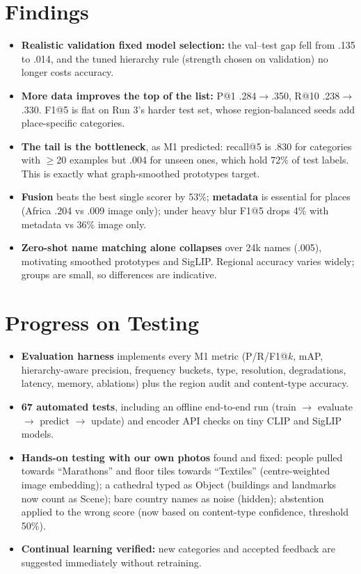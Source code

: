 \documentclass[10pt,twocolumn]{article}
\begin{document}
\section{Findings}
\begin{itemize}
\item \textbf{Realistic validation fixed model selection:} the val--test gap fell from .135 to .014, and the
tuned hierarchy rule (strength chosen on validation) no longer costs accuracy.
\item \textbf{More data improves the top of the list:} P@1 .284$\rightarrow$.350, R@10 .238$\rightarrow$.330.
F1@5 is flat on Run 3's harder test set, whose region-balanced seeds add place-specific categories.
\item \textbf{The tail is the bottleneck}, as M1 predicted: recall@5 is .830 for categories with $\geq$20
examples but .004 for unseen ones, which hold 72\% of test labels. This is exactly what graph-smoothed
prototypes target.
\item \textbf{Fusion} beats the best single scorer by 53\%; \textbf{metadata} is essential for places
(Africa .204 vs .009 image only); under heavy blur F1@5 drops 4\% with metadata vs 36\% image only.
\item \textbf{Zero-shot name matching alone collapses} over 24k names (.005), motivating smoothed prototypes and
SigLIP. Regional accuracy varies widely; groups are small, so differences are indicative.
\end{itemize}

\section{Progress on Testing}
\begin{itemize}
\item \textbf{Evaluation harness} implements every M1 metric (P/R/F1@$k$, mAP, hierarchy-aware precision,
frequency buckets, type, resolution, degradations, latency, memory, ablations) plus the region audit and
content-type accuracy.
\item \textbf{67 automated tests}, including an offline end-to-end run (train $\rightarrow$ evaluate
$\rightarrow$ predict $\rightarrow$ update) and encoder API checks on tiny CLIP and SigLIP models.
\item \textbf{Hands-on testing with our own photos} found and fixed: people pulled towards ``Marathons'' and
floor tiles towards ``Textiles'' (centre-weighted image embedding); a cathedral typed as Object (buildings and
landmarks now count as Scene); bare country names as noise (hidden); abstention applied to the wrong score
(now based on content-type confidence, threshold 50\%).
\item \textbf{Continual learning verified:} new categories and accepted feedback are suggested immediately
without retraining.
\end{itemize}
\end{document}
